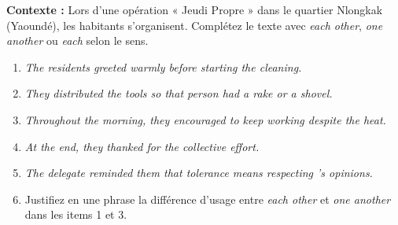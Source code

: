 \documentclass[11pt]{article}
\begin{document}
\begin{exercice}
\textbf{Contexte :} Lors d'une opération « Jeudi Propre » dans le quartier Nlongkak (Yaoundé), les habitants s'organisent. Complétez le texte avec \textit{each other}, \textit{one another} ou \textit{each} selon le sens.

\begin{enumerate}
\item \textit{The residents greeted \underline{\hspace{2.5cm}} warmly before starting the cleaning.}
\item \textit{They distributed the tools so that \underline{\hspace{2.5cm}} person had a rake or a shovel.}
\item \textit{Throughout the morning, they encouraged \underline{\hspace{2.5cm}} to keep working despite the heat.}
\item \textit{At the end, they thanked \underline{\hspace{2.5cm}} for the collective effort.}
\item \textit{The delegate reminded them that tolerance means respecting \underline{\hspace{2.5cm}}'s opinions.}
\item Justifiez en une phrase la différence d'usage entre \textit{each other} et \textit{one another} dans les items 1 et 3.
\end{enumerate}
\end{exercice}
\end{document}
